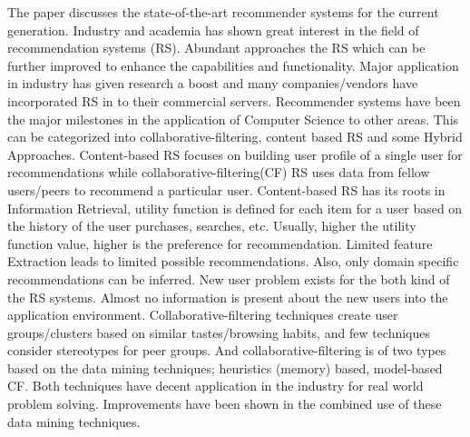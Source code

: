 The paper discusses the state-of-the-art recommender systems for the current generation. Industry and academia has shown great interest in the field of recommendation systems (RS). Abundant approaches the RS which can be further improved to enhance the capabilities and functionality. Major application in industry has given research a boost and many companies/vendors have incorporated RS in to their commercial servers. Recommender systems have been the major milestones in the application of Computer Science to other areas. This can be categorized into collaborative-filtering, content based RS and some Hybrid Approaches. Content-based RS focuses on building user profile of a single user for recommendations while collaborative-filtering(CF) RS uses data from fellow users/peers to recommend a particular user. Content-based RS has its roots in Information Retrieval, utility function is defined for each item for a user based on the history of the user purchases, searches, etc. Usually, higher the utility function value, higher is the preference for recommendation. Limited feature Extraction leads to limited possible recommendations. Also, only domain specific recommendations can be inferred. New user problem exists for the both kind of the RS systems. Almost no information is present about the new users into the application environment. Collaborative-filtering techniques create user groups/clusters based on similar tastes/browsing habits, and few techniques consider stereotypes for peer groups. And collaborative-filtering is of two types based on the data mining techniques; heuristics (memory) based, model-based CF. Both techniques have decent application in the industry for real world problem solving. Improvements have been shown in the combined use of these data mining techniques.
